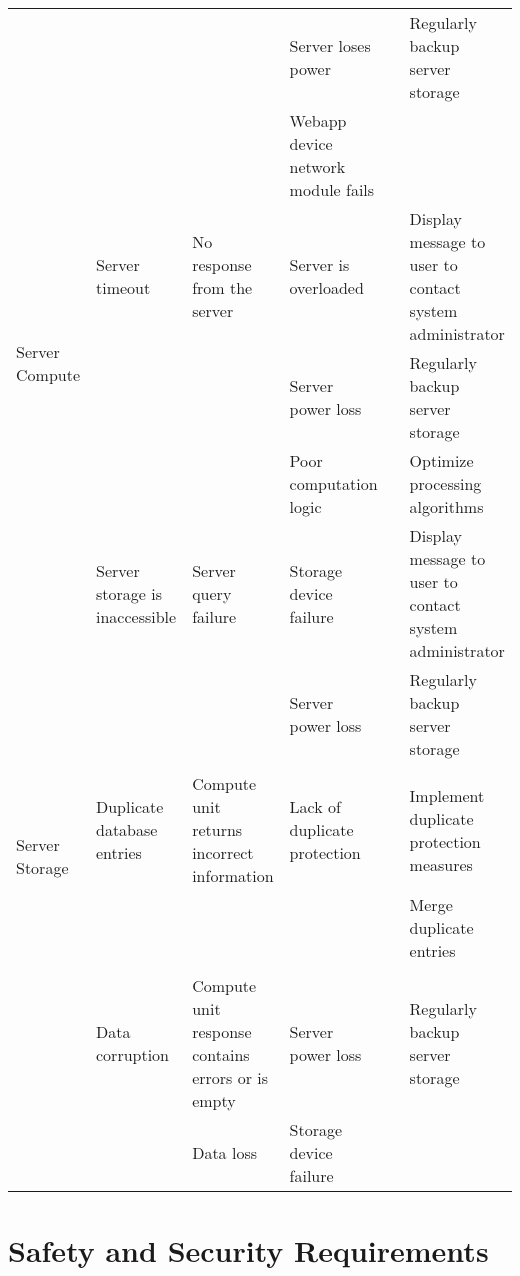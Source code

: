 \documentclass{article}
\begin{document}
\begin{landscape}
\begin{table}[]
{\begin{tabular}{|l|l|l|l|l|l|}
     &  &  & Server loses power &  & Regularly backup server storage \\
     &  &  & Webapp device network module fails &  &  \\
    \multirow{3}{*}{Server Compute} & Server timeout & No response from the server & Server is overloaded &  & Display message to user to contact system administrator \\
     &  &  & Server power loss &  & Regularly backup server storage \\
     &  &  & Poor computation logic &  & Optimize processing algorithms \\
    \multirow{8}{*}{Server Storage} & Server storage is inaccessible & Server query failure & Storage device failure &  & Display message to user to contact system administrator \\
     &  &  & Server power loss &  & Regularly backup server storage \\
     &  &  &  &  &  \\
     & Duplicate database entries & Compute unit returns incorrect information & Lack of duplicate protection &  & Implement duplicate protection measures \\
     &  &  &  &  & Merge duplicate entries \\
     &  &  &  &  &  \\
     & Data corruption & Compute unit response contains errors or is empty & Server power loss &  & Regularly backup server storage \\
     &  & Data loss & Storage device failure &  &  \\ \hline
    \end{tabular}
    }
\end{table}
\end{landscape}


\section{Safety and Security Requirements}

\end{document}
